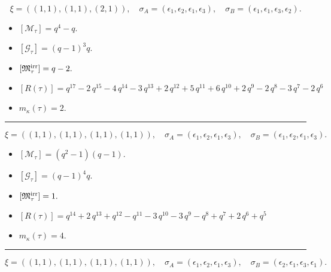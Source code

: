 \documentclass[10pt,a4paper]{amsart}
\begin{document}
$$\xi = ({(1, 1), (1, 1)}, {(2, 1)}),\quad \sigma_A = ({{\epsilon_1}, {\epsilon_2}}, {{\epsilon_1, \epsilon_3}}),\quad \sigma_B = ({{\epsilon_1}, {\epsilon_1}}, {{\epsilon_3, \epsilon_2}}).$$

\begin{itemize}
 \item $[\mathcal{M}_{\tau}] = q^{4} - q .$

 \item $[\mathcal{G}_{\tau}] = {\left(q - 1\right)}^{3} q .$

 \item $[{\frak M}_{\tau}^{\textrm{irr}}] = q - 2 .$

 \item $[R(\tau)] = q^{17} - 2 \, q^{15} - 4 \, q^{14} - 3 \, q^{13} + 2 \, q^{12} + 5 \, q^{11} + 6 \, q^{10} + 2 \, q^{9} - 2 \, q^{8} - 3 \, q^{7} - 2 \, q^{6} $

 \item $m_{\kappa}(\tau) = 2 .$

 \end{itemize}
\noindent\rule{8cm}{0.4pt}

$$\xi = ({(1, 1), (1, 1)}, {(1, 1), (1, 1)}),\quad \sigma_A = ({{\epsilon_1}, {\epsilon_2}}, {{\epsilon_1}, {\epsilon_3}}),\quad \sigma_B = ({{\epsilon_1}, {\epsilon_2}}, {{\epsilon_1}, {\epsilon_3}}).$$

\begin{itemize}
 \item $[\mathcal{M}_{\tau}] = {\left(q^{2} - 1\right)} {\left(q - 1\right)} .$

 \item $[\mathcal{G}_{\tau}] = {\left(q - 1\right)}^{4} q .$

 \item $[{\frak M}_{\tau}^{\textrm{irr}}] = 1 .$

 \item $[R(\tau)] = q^{14} + 2 \, q^{13} + q^{12} - q^{11} - 3 \, q^{10} - 3 \, q^{9} - q^{8} + q^{7} + 2 \, q^{6} + q^{5} $

 \item $m_{\kappa}(\tau) = 4 .$

 \end{itemize}
\noindent\rule{8cm}{0.4pt}

$$\xi = ({(1, 1), (1, 1)}, {(1, 1), (1, 1)}),\quad \sigma_A = ({{\epsilon_1}, {\epsilon_2}}, {{\epsilon_1}, {\epsilon_3}}),\quad \sigma_B = ({{\epsilon_2}, {\epsilon_1}}, {{\epsilon_3}, {\epsilon_1}}).$$
\end{document}
